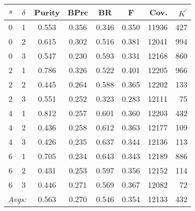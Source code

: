 \begin{table}[!h]
{\small
\centering
\setlength{\extrarowheight}{4pt}
\begin{tabular}{cc|ccccrr}
$s$ & $\delta$ & Purity &  BPrc & BR & F & Cov. & $K^{\prime}$ \\ \hline\hline
0 & 1 & 0.553 & 0.356 & 0.346 & 0.350 & 11936 & 427 \\
0 & 2 & 0.615 & 0.302 & 0.516 & 0.381 & 12041 & 994 \\%
0 & 3 & 0.547 & 0.230 & 0.593 & 0.331 & 12168 & 860 \\ \hline %
2 & 1 & 0.786 & 0.326 & 0.522 & 0.401 & 12205 & 966 \\%
2 & 2 & 0.445 & 0.264 & 0.588 & 0.365 & 12202 & 133 \\%
2 & 3 & 0.551 & 0.252 & 0.323 & 0.283 & 12111 & 75 \\ \hline %
4 & 1 & 0.812 & 0.257 & 0.601 & 0.360 & 12203 & 432 \\%
4 & 2 & 0.436 & 0.258 & 0.612 & 0.363 & 12177 & 109 \\%
4 & 3 & 0.426 & 0.235 & 0.637 & 0.344 & 12136 & 113 \\ \hline %
6 & 1 & 0.705 & 0.234 & 0.643 & 0.343 & 12189 & 886 \\%
6 & 2 & 0.431 & 0.253 & 0.597 & 0.356 & 12152 & 114 \\%
6 & 3 & 0.446 & 0.271 & 0.569 & 0.367 & 12082 & 72 \\ \hline \hline%
 \multicolumn{2}{r|}{\textit{Avgs:}} & 0.563 & 0.270 & 0.546 & 0.354 & 12133 & 432 \\
\end{tabular}
}
\end{table}
